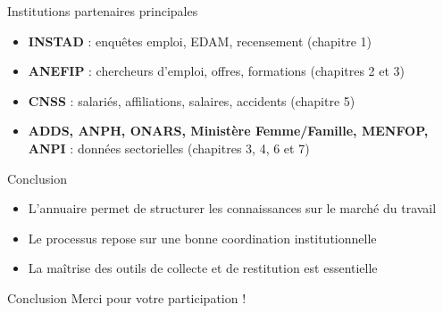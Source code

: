\documentclass{beamer}
\begin{document}
\begin{frame}{Institutions partenaires principales}
\begin{itemize}
  \item \textbf{INSTAD} : enqu\^etes emploi, EDAM, recensement (chapitre 1)
  \item \textbf{ANEFIP} : chercheurs d’emploi, offres, formations (chapitres 2 et 3)
  \item \textbf{CNSS} : salari\'es, affiliations, salaires, accidents (chapitre 5)
  \item \textbf{ADDS, ANPH, ONARS, Minist\`ere Femme/Famille, MENFOP, ANPI} : donn\'ees sectorielles (chapitres 3, 4, 6 et 7)
\end{itemize}
\end{frame}

\begin{frame}{Conclusion}
\begin{itemize}
  \item L’annuaire permet de structurer les connaissances sur le march\'e du travail
  \item Le processus repose sur une bonne coordination institutionnelle
  \item La ma\^itrise des outils de collecte et de restitution est essentielle
\end{itemize}

\end{frame}

\begin{frame}{Conclusion}
\centering
Merci pour votre participation !
\end{frame}
\end{document}
